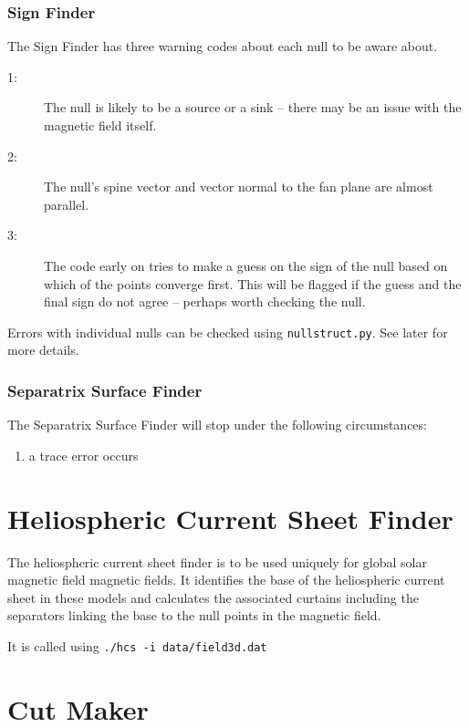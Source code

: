 \documentclass[12pt]{article}
\begin{document}
      \subsubsection{Sign Finder}
        The Sign Finder has three warning codes about each null to be aware about.
        \begin{description}
          \item [1:] The null is likely to be a source or a sink -- there may be an issue with the magnetic field itself.
          \item [2:] The null's spine vector and vector normal to the fan plane are almost parallel.
          \item [3:] The code early on tries to make a guess on the sign of the null based on which of the points converge first. This will be flagged if the guess and the final sign do not agree -- perhaps worth checking the null.
        \end{description}
        Errors with individual nulls can be checked using \texttt{nullstruct.py}. See later for more details.
      
      \subsubsection{Separatrix Surface Finder}
        The Separatrix Surface Finder will stop under the following circumstances:
        \begin{enumerate}
          \item a trace error occurs
        \end{enumerate}

  \section{Heliospheric Current Sheet Finder}

    The heliospheric current sheet finder is to be used uniquely for global solar magnetic field magnetic fields. It identifies the base of the heliospheric current sheet in these models and calculates the associated curtains including the separators linking the base to the null points in the magnetic field.

    It is called using \texttt{./hcs -i data/field3d.dat}

  \section{Cut Maker}
\end{document}
